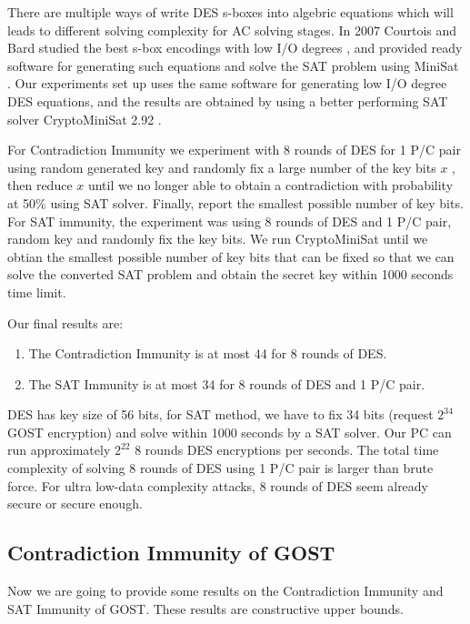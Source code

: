 There are multiple ways of write DES s-boxes into algebric equations which will leads to different solving complexity for AC solving stages. In 2007 Courtois and Bard studied the best s-box encodings with low I/O degrees \cite{courtois2007algebraicDES}, and provided ready software for generating such equations and solve the SAT problem using MiniSat \cite{minisat}. Our experiments set up uses the same software for generating low I/O degree DES equations, and the results are obtained by using a better performing SAT solver CryptoMiniSat 2.92 \cite{CryptoMiniSat}.

For Contradiction Immunity we experiment with 8 rounds of DES for 1 P/C pair using random generated key and randomly fix a large number of the key bits $x$ , then reduce $x$ until we no longer able to obtain a contradiction with probability at 50\% using SAT solver. Finally, report the smallest possible number of key bits. For SAT immunity, the experiment was using 8 rounds of DES and 1 P/C pair, random key and randomly fix the key bits. We run CryptoMiniSat until we obtian the smallest possible number of key bits that can be fixed so that we can solve the converted SAT problem and obtain the secret key within 1000 seconds time limit.

Our final results are:
\begin{enumerate}
	\item The Contradiction Immunity
	is at most 44 for 8 rounds of DES.
	\item
	The SAT Immunity
	is at most 34 for 8 rounds of DES and 1 P/C pair.
\end{enumerate}

DES has key size of 56 bits, for SAT method, we have to fix 34 bits (request $2^{34}$ GOST encryption) and solve within 1000 seconds by a SAT solver. Our PC can run approximately $2^{22}$ 8 rounds DES encryptions per seconds. The total time complexity of solving 8 rounds of DES using 1 P/C pair is larger than brute force. For ultra low-data complexity attacks, 8 rounds of DES seem already secure or secure enough.

\subsection{Contradiction Immunity of GOST}

Now we are going to provide some results on the Contradiction Immunity and SAT Immunity of GOST. These results are constructive upper bounds.

